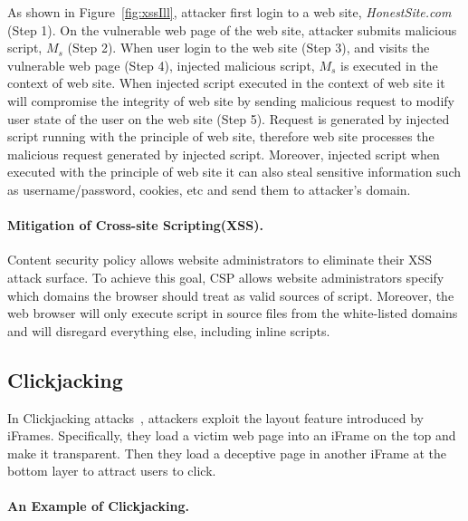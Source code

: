 As shown in Figure~\ref{fig:xssIll}, attacker first login to a web
site, {\em HonestSite.com} (Step 1). On the vulnerable web page of the
web site, attacker submits malicious script, $M_s$ (Step 2). When user
login to the web site (Step 3), and visits the vulnerable web page
(Step 4), injected malicious script, $M_s$ is executed in the context
of web site. When injected script executed in the context of web site
it will compromise the integrity of web site by sending malicious
request to modify user state of the user on the web site (Step
5). Request is generated by injected script running with the principle
of web site, therefore web site processes the malicious request
generated by injected script. Moreover, injected script when executed
with the principle of web site it can also steal sensitive information
such as username/password, cookies, etc and send them to attacker's
domain.

\paragraph{\bf Mitigation of Cross-site Scripting(XSS).}
Content security policy allows website administrators to eliminate
their XSS attack surface. To achieve this goal, CSP allows website
administrators specify which domains the browser should treat as valid
sources of script. Moreover, the web browser will only execute script
in source files from the white-listed domains and will disregard
everything else, including inline scripts.

\subsection{Clickjacking}
In Clickjacking attacks~\cite{nex08,sectheory08}, attackers exploit
the layout feature introduced by iFrames. Specifically, they load a
victim web page into an iFrame on the top and make it
transparent. Then they load a deceptive page in another iFrame at the
bottom layer to attract users to click.

\paragraph{\bf An Example of Clickjacking.}

